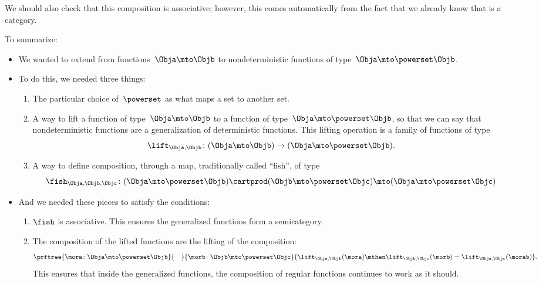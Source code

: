 We should also check that this composition is associative; however, this comes automatically from the fact that we already know that \Rel is a category.

To summarize:
\begin{itemize}
    \item We wanted to extend \Set from functions~$\Obja \mto \Objb$ to nondeterministic functions of type~$\Obja \mto \powerset\Objb$.
    \item To do this, we needed three things:
          \begin{enumerate}
              \item The particular choice of~$\powerset$ as what maps a set to another set.
              \item A way to lift a function of type~$\Obja \mto \Objb$ to a function of type~$\Obja \mto \powerset\Objb$, so that we can say that nondeterministic functions are a generalization of deterministic functions.
                    This lifting operation is a family of functions of type
                    \begin{equation}
                        \label{eq:monad-lift}
                        \lift_{\Obja, \Objb}\colon (\Obja \mto \Objb) \to (\Obja \mto \powerset\Objb).
                    \end{equation}
              \item A way to define composition, through a map, traditionally called ``fish'', of type
                    \begin{equation}
                        \label{eq:monad-fish}
                        \fish_{\Obja, \Objb, \Objc}\colon (\Obja \mto \powerset\Objb) \cartprod (\Objb \mto \powerset\Objc)
                        \mto (\Obja \mto \powerset \Objc)
                    \end{equation}
          \end{enumerate}
    \item And we needed these pieces to satisfy the conditions:
          \begin{enumerate}
              \item $\fish$ is associative.
                    This ensures the generalized functions form a semicategory.
              \item The composition of the lifted functions are the lifting of the composition:
                    \begin{equation}
                        \label{eq:monad-fish-associative}
                        \prftree{
                            \mora\colon \Obja \mto \powerset\Objb
                        }{
                            \quad
                        }{
                            \morb\colon \Objb \mto \powerset \Objc
                        }{
                            \lift_{\Obja,\Objb}(\mora)\mthen\lift_{\Objb,\Objc}(\morb) =  \lift_{\Obja,\Objc}(\morab)
                        }.
                    \end{equation}
                    This ensures that inside the generalized functions, the composition of regular functions continues to work as it should.
          \end{enumerate}
\end{itemize}

